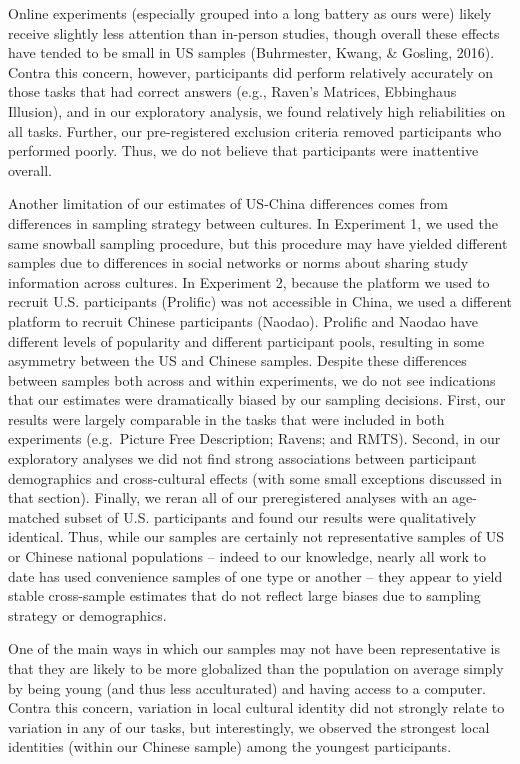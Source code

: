 \documentclass[
  man,floatsintext]{apa6}
\begin{document}
Online experiments (especially grouped into a long battery as ours were) likely receive slightly less attention than in-person studies, though overall these effects have tended to be small in US samples (Buhrmester, Kwang, \& Gosling, 2016). Contra this concern, however, participants did perform relatively accurately on those tasks that had correct answers (e.g., Raven's Matrices, Ebbinghaus Illusion), and in our exploratory analysis, we found relatively high reliabilities on all tasks. Further, our pre-registered exclusion criteria removed participants who performed poorly. Thus, we do not believe that participants were inattentive overall.

Another limitation of our estimates of US-China differences comes from differences in sampling strategy between cultures. In Experiment 1, we used the same snowball sampling procedure, but this procedure may have yielded different samples due to differences in social networks or norms about sharing study information across cultures. In Experiment 2, because the platform we used to recruit U.S. participants (Prolific) was not accessible in China, we used a different platform to recruit Chinese participants (Naodao). Prolific and Naodao have different levels of popularity and different participant pools, resulting in some asymmetry between the US and Chinese samples. Despite these differences between samples both across and within experiments, we do not see indications that our estimates were dramatically biased by our sampling decisions. First, our results were largely comparable in the tasks that were included in both experiments (e.g.~Picture Free Description; Ravens; and RMTS). Second, in our exploratory analyses we did not find strong associations between participant demographics and cross-cultural effects (with some small exceptions discussed in that section). Finally, we reran all of our preregistered analyses with an age-matched subset of U.S. participants and found our results were qualitatively identical.
Thus, while our samples are certainly not representative samples of US or Chinese national populations -- indeed to our knowledge, nearly all work to date has used convenience samples of one type or another -- they appear to yield stable cross-sample estimates that do not reflect large biases due to sampling strategy or demographics.

One of the main ways in which our samples may not have been representative is that they are likely to be more globalized than the population on average simply by being young (and thus less acculturated) and having access to a computer. Contra this concern, variation in local cultural identity did not strongly relate to variation in any of our tasks, but interestingly, we observed the strongest local identities (within our Chinese sample) among the youngest participants.
\end{document}
